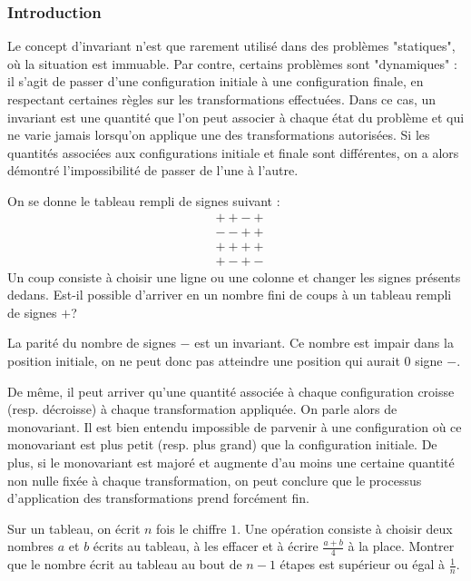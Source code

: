 
\subsubsection{Introduction}
Le concept d'invariant n'est que rarement utilisé dans des problèmes "statiques", où la situation est immuable. Par contre, certains problèmes sont "dynamiques" : il s'agit de passer d'une configuration initiale à une configuration finale, en respectant certaines règles sur les transformations effectuées. Dans ce cas, un invariant est une quantité que l'on peut associer à chaque état du problème et qui ne varie jamais lorsqu'on applique une des transformations autorisées. Si les quantités associées aux configurations initiale et finale sont différentes, on a alors démontré l'impossibilité de passer de l'une à l'autre.\\

\begin{exo}
On se donne le tableau rempli de signes suivant :
\begin{align*}
& ++-+\\
& --++\\
&++++\\
& +-+-
\end{align*}
Un coup consiste à choisir une ligne ou une colonne et changer les signes présents dedans. Est-il possible d'arriver en un nombre fini de coups à un tableau rempli de signes $+$?
\end{exo}

\begin{sol}
La parité du nombre de signes $-$ est un invariant. Ce nombre est impair dans la position initiale, on ne peut donc pas atteindre une position qui aurait $0$ signe $-$.
\end{sol}


De même, il peut arriver qu'une quantité associée à chaque configuration croisse (resp. décroisse) à chaque transformation appliquée. On parle alors de monovariant. Il est bien entendu impossible de parvenir à une configuration où ce monovariant est plus petit (resp. plus grand) que la configuration initiale. De plus, si le monovariant est majoré et augmente d'au moins une certaine quantité non nulle fixée à chaque transformation, on peut conclure que le processus d'application des transformations prend forcément fin.\\

\begin{exo}
Sur un tableau, on écrit $n$ fois le chiffre $1$. Une opération consiste à choisir deux nombres $a$ et $b$ écrits au tableau, à les effacer et à écrire $\frac{a+b}{4}$ à la place. Montrer que le nombre écrit au tableau au bout de $n-1$ étapes est supérieur ou égal à $\frac1{n}$.
\end{exo}

